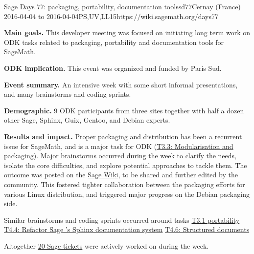 \begin{event}{Sage Days 77: packaging, portability, documentation tools}{sd77}{Cernay (France) 2016-04-04 to 2016-04-04}{PS,UV,LL}{15}{https://wiki.sagemath.org/days77}

  \textbf{Main goals.} This developer meeting was focused on
  initiating long term work on ODK tasks related to packaging,
  portability and documentation tools for SageMath.

  \textbf{ODK implication.} This event was organized and funded by
  Paris Sud.

  \textbf{Event summary.} An intensive week with some short informal
  presentations, and many brainstorms and coding sprints.

  \textbf{Demographic.} 9 ODK participants from three sites together
  with half a dozen other Sage, Sphinx, Guix, Gentoo, and Debian
  experts.

  \textbf{Results and impact.} Proper packaging and distribution has
  been a recurrent issue for SageMath, and is a major task for ODK
  (\href{https://github.com/OpenDreamKit/OpenDreamKit/issues/52}{T3.3:
    Modularisation and packaging}). Major brainstorms occurred during
  the week to clarify the needs, isolate the core difficulties, and
  explore potential approaches to tackle them. The outcome was posted
  on the \href{https://wiki.sagemath.org/days77/packaging}{Sage Wiki},
  to be shared and further edited by the community. This fostered
  tighter collaboration between the packaging efforts for various
  Linux distribution, and triggered major progress on the Debian
  packaging side.

  Similar brainstorms and coding sprints occurred around tasks
  \href{https://github.com/OpenDreamKit/OpenDreamKit/issues/50}{T3.1 portability}
  \href{https://github.com/OpenDreamKit/OpenDreamKit/issues/72}{T4.4: Refactor Sage 's Sphinx documentation system}
  \href{https://github.com/OpenDreamKit/OpenDreamKit/issues/74}{T4.6: Structured documents}

  Altogether
  \href{https://trac.sagemath.org/query?keywords=~days77&col=id&col=summary&col=status&col=type&col=priority&col=milestone&col=component&order=priority}{20
    Sage tickets} were actively worked on during the week.
\end{event}
